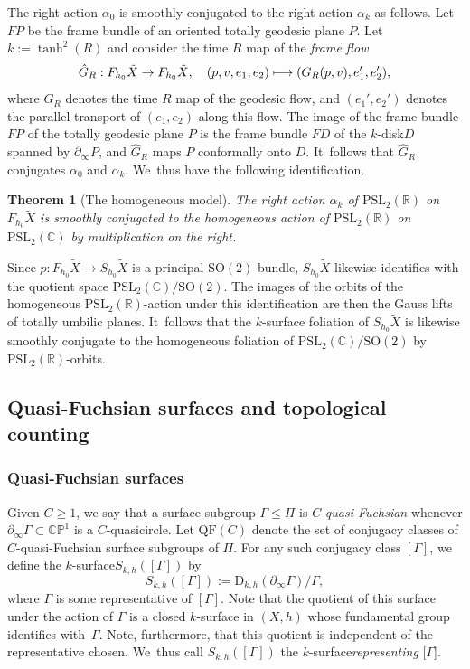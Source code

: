 \documentclass[11pt]{article}
\newcommand{\Subsection}{\subsection}
\newcommand\mto{\mathchoice{\longmapsto}{\mapsto}{\mapsto}{\mapsto}}
\newcommand{\ksurface}{$k$\nobreakdash-surface\xspace}
\newcommand{\kdisk}{$k$\nobreakdash-disk\xspace}
\theoremstyle{plain}
\newtheorem{theorem}{Theorem}[section]
\theoremstyle{definition}
\newcommand\PSL{\mathrm{PSL}_2(\mathbb{R})}
\newcommand\PSLc{\mathrm{PSL}_2(\mathbb{C})}
\newcommand{\C}{{\mathbb C}}
\newcommand{\PP}{{\mathbb P}}
\let\dans\subset
\newcommand{\QF}{\mathrm{QF}}
\newcommand{\rD}{\mathrm{D}}
\newcommand{\bord}{\partial_{\infty}}
\begin{document}
The right action $\alpha_0$ is smoothly conjugated to the right action $\alpha_k$ as follows. Let $FP$ be the frame bundle of an oriented totally geodesic plane $P$. Let $k:=\tanh^2(R)$ and consider the time $R$ map of the \emph{frame flow}
\[
\hat G_R:F_{h_0}\tilde X\to F_{h_0}\tilde X,\quad(p,v,e_1,e_2)\mto(G_R(p,v),e_1',e_2'),
\]
where $G_R$ denotes the time $R$ map of the geodesic flow, and $(e_1',e_2')$ denotes the parallel transport of $(e_1,e_2)$ along this flow. The image of the frame bundle $FP$ of the totally geodesic plane $P$ is the frame bundle $FD$ of the \kdisk $D$ spanned by $\bord P$, and $\hat G_R$ maps $P$ conformally onto $D$. It~follows that $\hat G_R$ conjugates $\alpha_0$ and $\alpha_k$. We~thus have the following identification.

\begin{theorem}[The homogeneous model]\label{t.homogeneous_model}
The right action $\alpha_k$ of $\PSL$ on $F_{h_0}\tilde{X}$ is smoothly conjugated to the homogeneous action of $\PSL$ on $\PSLc$ by multiplication on the right.
\end{theorem}

Since $p:F_{h_0}\tilde{X}\to S_{h_0}\tilde{X}$ is a principal $\text{SO}(2)$-bundle, $S_{h_0}\tilde{X}$ likewise identifies with the quotient space $\PSLc/\text{SO}(2)$. The images of the orbits of the homogeneous $\PSL$-action under this identification are then the Gauss lifts of totally umbilic planes. It~follows that the \ksurface foliation of $S_{h_0}\tilde{X}$ is likewise smoothly conjugate to the homogeneous foliation of $\PSLc/\text{SO}(2)$ by $\PSL$-orbits.

\Subsection{Quasi-Fuchsian surfaces and topological counting}

\subsubsection{Quasi-Fuchsian surfaces} Given $C\geq 1$, we say that a surface subgroup \hbox{$\Gamma\leq\Pi$} is $C$-\emph{quasi-Fuchsian} whenever $\partial_\infty\Gamma\dans\C\PP^1$ is a $C$-quasicircle. Let $\QF(C)$ denote the set of conjugacy classes of $C$-quasi-Fuchsian surface subgroups of $\Pi$. For any such conjugacy class $[\Gamma]$, we define the \ksurface $S_{k,h}([\Gamma])$ by
\begin{equation}\label{eq.rep_surface}
S_{k,h}([\Gamma]):=\rD_{k,h}(\partial_\infty\Gamma)/\Gamma,
\end{equation}
where $\Gamma$ is some representative of $[\Gamma]$. Note that the quotient of this surface under the action of $\Gamma$ is a closed \ksurface in $(X,h)$ whose fundamental group identifies with~$\Gamma$. Note, furthermore, that this quotient is independent of the representative chosen. We~thus call $S_{k,h}([\Gamma])$ the \ksurface \emph{representing} $[\Gamma$].
\end{document}
